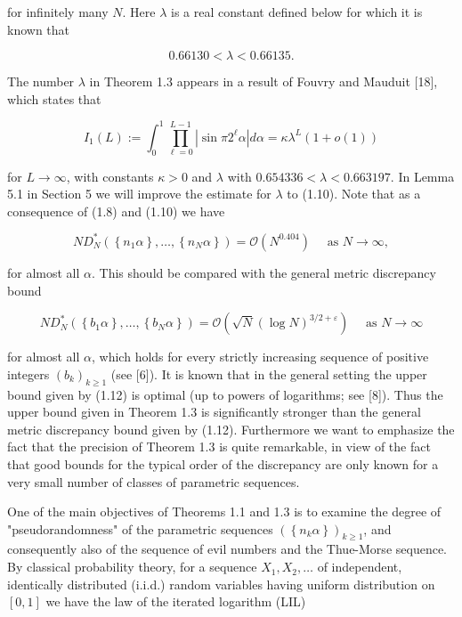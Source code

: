 \documentclass[10pt]{article}
\begin{document}
for infinitely many $N$. Here $\lambda$ is a real constant defined below for which it is known that


\begin{equation*}
0.66130<\lambda<0.66135 . \tag{1.10}
\end{equation*}


The number $\lambda$ in Theorem 1.3 appears in a result of Fouvry and Mauduit [18], which states that


\begin{equation*}
I_{1}(L):=\int_{0}^{1} \prod_{\ell=0}^{L-1}\left|\sin \pi 2^{\ell} \alpha\right| d \alpha=\kappa \lambda^{L}(1+o(1)) \tag{1.11}
\end{equation*}


for $L \rightarrow \infty$, with constants $\kappa>0$ and $\lambda$ with $0.654336<\lambda<0.663197$. In Lemma 5.1 in Section 5 we will improve the estimate for $\lambda$ to (1.10). Note that as a consequence of (1.8) and (1.10) we have

$$
N D_{N}^{*}\left(\left\{n_{1} \alpha\right\}, \ldots,\left\{n_{N} \alpha\right\}\right)=\mathcal{O}\left(N^{0.404}\right) \quad \text { as } N \rightarrow \infty,
$$

for almost all $\alpha$. This should be compared with the general metric discrepancy bound


\begin{equation*}
N D_{N}^{*}\left(\left\{b_{1} \alpha\right\}, \ldots,\left\{b_{N} \alpha\right\}\right)=\mathcal{O}\left(\sqrt{N}(\log N)^{3 / 2+\varepsilon}\right) \quad \text { as } N \rightarrow \infty \tag{1.12}
\end{equation*}


for almost all $\alpha$, which holds for every strictly increasing sequence of positive integers $\left(b_{k}\right)_{k \geqslant 1}$ (see [6]). It is known that in the general setting the upper bound given by (1.12) is optimal (up to powers of logarithms; see [8]). Thus the upper bound given in Theorem 1.3 is significantly stronger than the general metric discrepancy bound given by (1.12). Furthermore we want to emphasize the fact that the precision of Theorem 1.3 is quite remarkable, in view of the fact that good bounds for the typical order of the discrepancy are only known for a very small number of classes of parametric sequences.

One of the main objectives of Theorems 1.1 and 1.3 is to examine the degree of "pseudorandomness" of the parametric sequences $\left(\left\{n_{k} \alpha\right\}\right)_{k \geqslant 1}$, and consequently also of the sequence of evil numbers and the Thue-Morse sequence. By classical probability theory, for a sequence $X_{1}, X_{2}, \ldots$ of independent, identically distributed (i.i.d.) random variables having uniform distribution on $[0,1]$ we have the law of the iterated logarithm (LIL)
\end{document}
